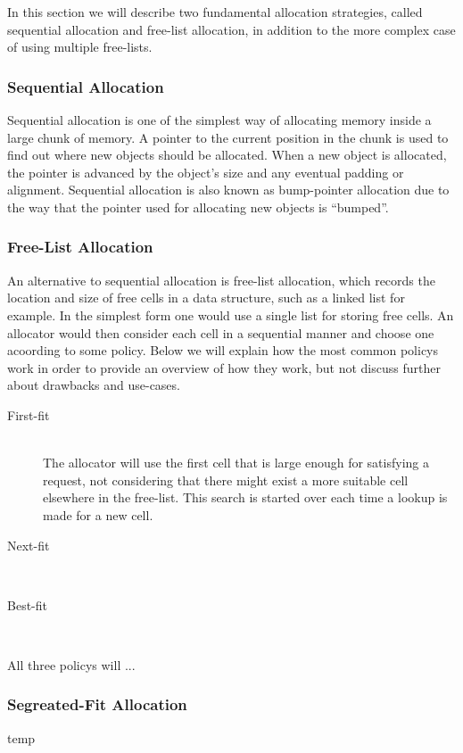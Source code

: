 
In this section we will describe two fundamental allocation strategies, called sequential allocation and free-list allocation, in addition to the more complex case of using multiple free-lists.

\subsubsection{Sequential Allocation}
Sequential allocation is one of the simplest way of allocating memory inside a large chunk of memory. A pointer to the current position in the chunk is used to find out where new objects should be allocated. When a new object is allocated, the pointer is advanced by the object's size and any eventual padding or alignment. Sequential allocation is also known as bump-pointer allocation due to the way that the pointer used for allocating new objects is ``bumped''.


\subsubsection{Free-List Allocation}
An alternative to sequential allocation is free-list allocation, which records the location and size of free cells in a data structure, such as a linked list for example. In the simplest form one would use a single list for storing free cells. An allocator would then consider each cell in a sequential manner and choose one acoording to some policy. Below we will explain how the most common policys work in order to provide an overview of how they work, but not discuss further about drawbacks and use-cases. 

\begin{description}
    \item[First-fit] \hfill\\
        The allocator will use the first cell that is large enough for satisfying a request, not considering that there might exist a more suitable cell elsewhere in the free-list. This search is started over each time a lookup is made for a new cell.
    \item[Next-fit] \hfill \\
    \item[Best-fit] \hfill \\
\end{description}

All three policys will ...


\subsubsection{Segreated-Fit Allocation}
temp

